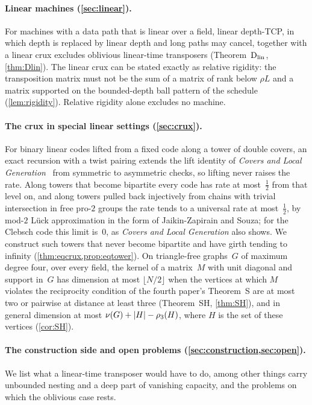 \paragraph{Linear machines (\cref{sec:linear}).} For machines with a data path that is linear over a field, linear depth-TCP,
in which depth is replaced by linear depth and long paths may cancel, together with a linear crux excludes oblivious
linear-time transposers (Theorem~$\mathrm{D}_{\mathrm{lin}}$, \cref{thm:Dlin}). The linear crux can be stated exactly as relative rigidity: the
transposition matrix must not be the sum of a matrix of rank below $\rho L$ and a matrix supported on the bounded-depth ball
pattern of the schedule (\cref{lem:rigidity}). Relative rigidity alone excludes no machine.

\paragraph{The crux in special linear settings (\cref{sec:crux}).} For binary linear codes lifted from a fixed code along a
tower of double covers, an exact recursion with a twist pairing extends the lift identity of \emph{Covers and Local
Generation}~\cite{Covers2026} from symmetric to asymmetric checks, so lifting never raises the rate. Along towers that become
bipartite every code has rate at most~$\frac12$ from that level on, and along towers pulled back injectively from chains with
trivial intersection in free pro-$2$ groups the rate tends to a universal rate at most~$\frac12$, by mod-$2$ Lück approximation
in the form of Jaikin-Zapirain and Souza; for the Clebsch code this limit is~$0$, as \emph{Covers and Local Generation} also
shows. We construct such towers that never become bipartite and have girth tending to infinity (\cref{thm:eqcrux,prop:eqtower}).
On triangle-free graphs~$G$ of maximum degree four, over every field, the kernel of a matrix~$M$ with unit diagonal and support
in~$G$ has dimension at most $\lfloor N/2\rfloor$ when the vertices at which $M$ violates the reciprocity condition of the fourth
paper's Theorem~S are at most two or pairwise at distance at least three (Theorem~SH, \cref{thm:SH}), and in general dimension at
most $\nu(G)+\lvert H \rvert-\rho_3(H)$, where $H$ is the set of these vertices (\cref{cor:SH}).

\paragraph{The construction side and open problems (\cref{sec:construction,sec:open}).} We list what a linear-time transposer
would have to do, among other things carry unbounded nesting and a deep part of vanishing capacity, and the problems on which the
oblivious case rests.

